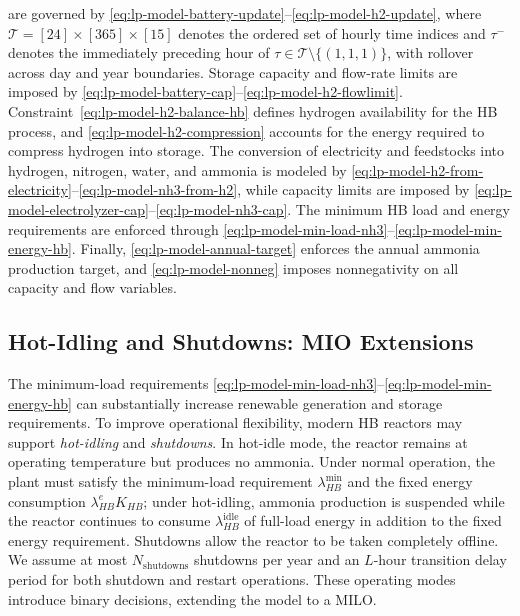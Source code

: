 \documentclass[11pt, letter]{article}
\begin{document}
are governed by \eqref{eq:lp-model-battery-update}--\eqref{eq:lp-model-h2-update},
where $\mathcal{T}=[24]\times[365]\times[15]$ denotes the ordered set of
hourly time indices and $\tau^{-}$ denotes the immediately preceding hour of
$\tau\in\mathcal{T}\setminus\{(1,1,1)\}$, with rollover across day and year
boundaries. Storage capacity and flow-rate limits are imposed by
\eqref{eq:lp-model-battery-cap}--\eqref{eq:lp-model-h2-flowlimit}.
Constraint~\eqref{eq:lp-model-h2-balance-hb} defines hydrogen availability for
the HB process, and \eqref{eq:lp-model-h2-compression} accounts for
the energy required to compress hydrogen into storage. The conversion of
electricity and feedstocks into hydrogen, nitrogen, water, and ammonia is
modeled by \eqref{eq:lp-model-h2-from-electricity}--\eqref{eq:lp-model-nh3-from-h2},
while capacity limits are imposed by
\eqref{eq:lp-model-electrolyzer-cap}--\eqref{eq:lp-model-nh3-cap}. The minimum
HB load and energy requirements are enforced through
\eqref{eq:lp-model-min-load-nh3}--\eqref{eq:lp-model-min-energy-hb}. Finally,
\eqref{eq:lp-model-annual-target} enforces the annual ammonia production
target, and \eqref{eq:lp-model-nonneg} imposes nonnegativity on all capacity
and flow variables.\subsection{Hot-Idling and Shutdowns: MIO Extensions}\label{section:mip}

The minimum-load requirements
\eqref{eq:lp-model-min-load-nh3}--\eqref{eq:lp-model-min-energy-hb}
can substantially increase renewable generation and storage requirements. To improve operational flexibility, modern HB reactors may support \emph{hot-idling} and \emph{shutdowns}. In hot-idle mode, the reactor remains at operating temperature but produces no ammonia. Under normal operation, the plant must satisfy the minimum-load requirement $\lambda_{HB}^{\min}$ and the fixed energy consumption $\lambda_{HB}^{e}K_{HB}$; under hot-idling, ammonia production is suspended while the reactor continues to consume $\lambda_{HB}^{\mathrm{idle}}$ of full-load energy in addition to the fixed energy requirement. Shutdowns allow the reactor to be taken completely offline. We assume at most $N_{\mathrm{shutdowns}}$ shutdowns per year and an $L$-hour transition delay period for both shutdown and restart operations. These operating modes introduce binary decisions, extending the model to a MILO.
\end{document}

